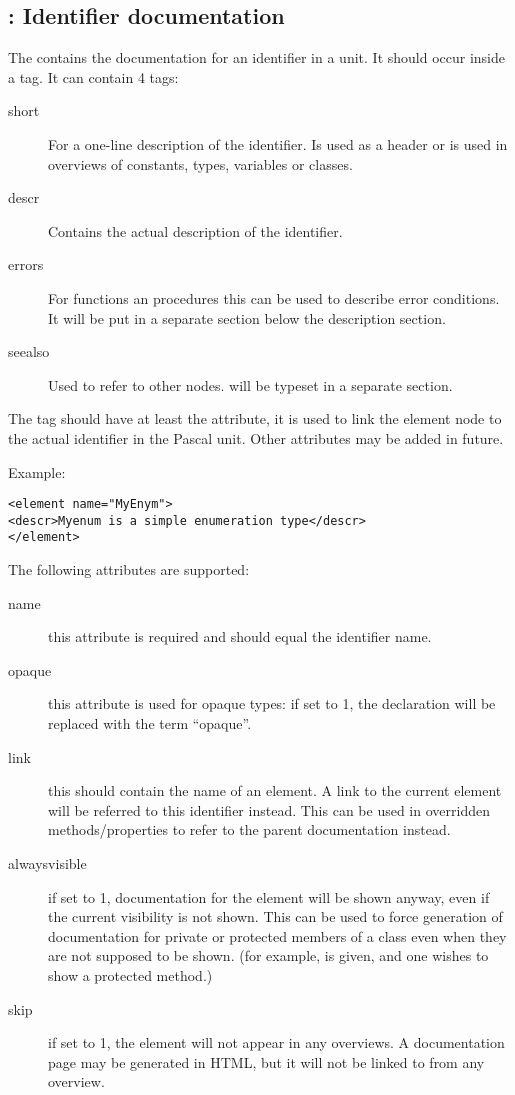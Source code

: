 \subsection{ : Identifier documentation}
\label{tag:element}
The  contains the documentation for an identifier in a unit. It
should occur inside a  tag. It can contain 4 tags:
\begin{description}
\item[short] For a one-line description of the identifier. Is used as a
header or is used in overviews of constants, types, variables or classes.
\item[descr] Contains the actual description of the identifier.
\item[errors] For functions an procedures this can be used to describe error
conditions. It will be put in a separate section below the description
section.
\item[seealso] Used to refer to other nodes. will be typeset in a separate
section.
\end{description}

The  tag should have at least the  attribute, it 
is used to link the element node to the actual identifier in the Pascal unit.
Other attributes may be added in future.

Example:
\begin{verbatim}
<element name="MyEnym">
<descr>Myenum is a simple enumeration type</descr>
</element>
\end{verbatim}

The following attributes are supported:
\begin{description}
\item [name] this attribute is required and should equal the identifier name.
\item [opaque] this attribute is used for opaque types: if set to 1, the declaration will be replaced with the term ``opaque''.
\item [link] this should contain the name of an element. A link to the current element will be referred to this identifier instead. 
This can be used in overridden methods/properties to refer to the parent documentation instead.
\item [alwaysvisible] if set to 1, documentation for the element will be shown anyway, even if the current visibility is not shown. 
This can be used to force generation of documentation for private or protected members of a class even when they are not supposed to be shown. 
(for example,  is given, and one wishes to show a protected method.)
\item[skip] if set to 1, the element will not appear in any overviews. 
A documentation page may be generated in HTML, but it will not be linked to from any overview.
\end{description}


